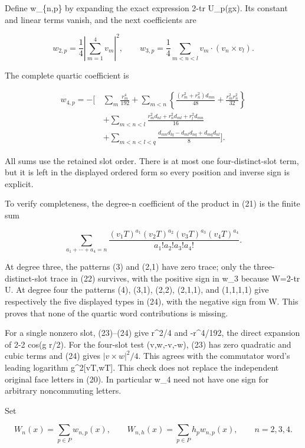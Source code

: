 \documentclass[
  11pt,
]{article}
\begin{document}
Define w\_\{n,p\} by expanding the exact expression 2-tr U\_p(gx). Its
constant and linear terms vanish, and the next coefficients are

\[
 \boxed{w_{2,p}=\frac14\left|\sum_{m=1}^4v_m\right|^2,
 \qquad
 w_{3,p}=\frac14\sum_{m<n<l}v_m\cdot(v_n\times v_l).}       \tag{23}
\]

The complete quartic coefficient is

\[
 \boxed{\begin{split}
 w_{4,p}=-\Bigg[\,
 &\sum_m\frac{r_m^4}{192}
 +\sum_{m<n}\left\{\frac{(r_m^2+r_n^2)d_{mn}}{48}
                                  +\frac{r_m^2r_n^2}{32}\right\}\\
 &+\sum_{m<n<l}
       \frac{r_m^2d_{nl}+r_n^2d_{ml}+r_l^2d_{mn}}{16}\\
 &+\sum_{m<n<l<q}
       \frac{d_{mn}d_{lq}-d_{ml}d_{nq}+d_{mq}d_{nl}}8
                                                        \Bigg].
 \end{split}}                                                \tag{24}
\]

All sums use the retained slot order. There is at most one
four-distinct-slot term, but it is left in the displayed ordered form so
every position and inverse sign is explicit.

To verify completeness, the degree-n coefficient of the product in (21)
is the finite sum

\[
 \sum_{a_1+\cdots+a_4=n}
 \frac{(v_1T)^{a_1}(v_2T)^{a_2}
       (v_3T)^{a_3}(v_4T)^{a_4}}{a_1!a_2!a_3!a_4!}.
\]

At degree three, the patterns (3) and (2,1) have zero trace; only the
three-distinct-slot trace in (22) survives, with the positive sign in
w\_3 because W=2-tr U. At degree four the patterns (4), (3,1), (2,2),
(2,1,1), and (1,1,1,1) give respectively the five displayed types in
(24), with the negative sign from W. This proves that none of the
quartic word contributions is missing.

For a single nonzero slot, (23)--(24) give r\^{}2/4 and -r\^{}4/192, the
direct expansion of 2-2 cos(g r/2). For the four-slot test (v,w,-v,-w),
(23) has zero quadratic and cubic terms and (24) gives
\(|v\times w|^2/4\). This agrees with the commutator word's leading
logarithm g\^{}2{[}vT,wT{]}. This check does not replace the independent
original face letters in (20). In particular w\_4 need not have one sign
for arbitrary noncommuting letters.

Set

\[
 W_n(x)=\sum_{p\in P}w_{n,p}(x),\qquad
 W_{n,h}(x)=\sum_{p\in P}h_p w_{n,p}(x),\qquad n=2,3,4.
                                                               \tag{25}
\]
\end{document}
